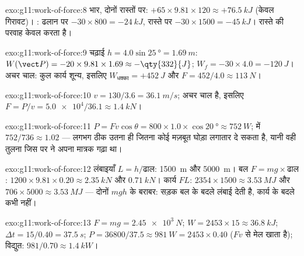 \begin{solution}{exo:g11:work-of-force:8}
भार, दोनों रास्तों पर: $+65 \times 9.81 \times 120 \approx
+\qty{76.5}{kJ}$ (केवल गिरावट)। : ढलान पर
$-30 \times 800 =
-\qty{24}{kJ}$, रास्ते पर $-30 \times 1500 = -\qty{45}{kJ}$। रास्ते की परवाह केवल  करता है।
\end{solution}

\begin{solution}{exo:g11:work-of-force:9}
चढ़ाई $h = 4.0\sin\qty{25}{\degree} = \qty{1.69}{m}$: $W(\vect P) = -20 \times 9.81 \times 1.69 \approx -\qty{332}{J}$; $W_f = -30 \times 4.0 = -\qty{120}{J}$। अचर चाल: कुल कार्य शून्य, इसलिए
$W_{\text{धक्का}} = +\qty{452}{J}$ और $F = 452/4.0 \approx \qty{113}{N}$।
\end{solution}

\begin{solution}{exo:g11:work-of-force:10}
$v = 130/3.6 = \qty{36.1}{m/s}$; अचर चाल है, इसलिए $F = P/v = \num{5.0e4}/36.1 \approx \qty{1.4}{kN}$।
\end{solution}

\begin{solution}{exo:g11:work-of-force:11}
$P = Fv\cos\theta = 800 \times 1.0 \times \cos\qty{20}{\degree}
\approx \qty{752}{W}$;  में $752/736 \approx \num{1.02}$ --- लगभग ठीक उतना ही जितना कोई मज़बूत
घोड़ा लगातार दे सकता है, यानी वही तुलना जिस पर  ने अपना मात्रक
गढ़ा था।
\end{solution}

\begin{solution}{exo:g11:work-of-force:12}
लंबाइयाँ $L = h/\text{ढाल}$: \qty{1500}{m} और \qty{5000}{m}। बल $F = mg \times \text{ढाल}$: $1200 \times 9.81 \times 0.20 \approx
\qty{2.35}{kN}$ और $\qty{0.71}{kN}$।
कार्य $FL$: $2354 \times 1500
\approx \qty{3.53}{MJ}$ और $706 \times 5000 \approx \qty{3.53}{MJ}$ --- दोनों $mgh$ के बराबर: सड़क
बल के बदले लंबाई देती है, कार्य के बदले कभी नहीं।
\end{solution}

\begin{solution}{exo:g11:work-of-force:13}
$F = mg = \qty{2.45e3}{N}$; $W = 2453 \times 15 \approx \qty{36.8}{kJ}$; $\Delta t = 15/0.40 = \qty{37.5}{s}$; $P = 36800/37.5 \approx \qty{981}{W} = 2453 \times 0.40$ ($Fv$ से मेल खाता है); विद्युत: $981/0.70 \approx \qty{1.4}{kW}$।
\end{solution}

